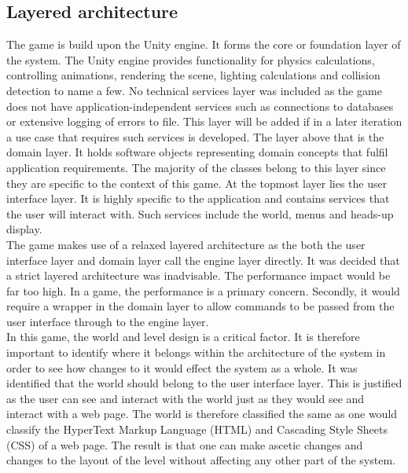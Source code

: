 \documentclass[11pt,a4paper]{article}
\begin{document}
\subsection{Layered architecture}
The game is build upon the Unity engine. It forms the core or foundation layer of the system. The Unity engine provides functionality for physics calculations, controlling animations, rendering the scene, lighting calculations and collision detection to name a few. No technical services layer was included as the game does not have application-independent services such as connections to databases or extensive logging of errors to file. This layer will be added if in a later iteration a use case that requires such services is developed. The layer above that is the domain layer. It holds software objects representing domain concepts that fulfil application requirements. The majority of the classes belong to this layer since they are specific to the context of this game. At the topmost layer lies the user interface layer. It is highly specific to the application and contains services that the user will interact with. Such services include the world, menus and heads-up display.\smallskip\\
The game makes use of a relaxed layered architecture as the both the user interface layer and domain layer call the engine layer directly. It was decided that a strict layered architecture was inadvisable. The performance impact would be far too high. In a game, the performance is a primary concern. Secondly, it would require a wrapper in the domain layer to allow commands to be passed from the user interface through to the engine layer. \smallskip\\
In this game, the world and level design is a critical factor. It is therefore important to identify where it belongs within the architecture of the system in order to see how changes to it would effect the system as a whole. It was identified that the world should belong to the user interface layer. This is justified as the user can see and interact with the world just as they would see and interact with a web page. The world is therefore classified the same as one would classify the HyperText Markup Language (HTML) and Cascading Style Sheets (CSS) of a web page. The result is that one can make ascetic changes and changes to the layout of the level without affecting any other part of the system.
\end{document}
